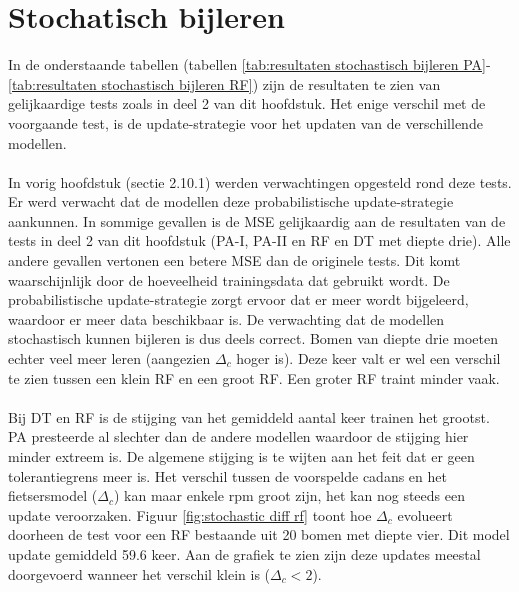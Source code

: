 \section{Stochatisch bijleren}
In de onderstaande tabellen (tabellen \ref{tab:resultaten stochastisch bijleren PA}-\ref{tab:resultaten stochastisch bijleren RF}) zijn de resultaten te zien van gelijkaardige tests zoals in deel 2 van dit hoofdstuk. Het enige verschil met de voorgaande test, is de update-strategie voor het updaten van de verschillende modellen.
\\\\
In vorig hoofdstuk (sectie 2.10.1) werden verwachtingen opgesteld rond deze tests. Er werd verwacht dat de modellen deze probabilistische update-strategie aankunnen. In sommige gevallen is de MSE gelijkaardig aan de resultaten van de tests in deel 2 van dit hoofdstuk (PA-I, PA-II en RF en DT met diepte drie). Alle andere gevallen vertonen een betere MSE dan de originele tests. Dit komt waarschijnlijk door de hoeveelheid trainingsdata dat gebruikt wordt. De probabilistische update-strategie zorgt ervoor dat er meer wordt bijgeleerd, waardoor er meer data beschikbaar is. De verwachting dat de modellen stochastisch kunnen bijleren is dus deels correct. Bomen van diepte drie moeten echter veel meer leren (aangezien $\Delta_c$ hoger is). Deze keer valt er wel een verschil te zien tussen een klein RF en een groot RF. Een groter RF traint minder vaak.
\\\\
Bij DT en RF is de stijging van het gemiddeld aantal keer trainen het grootst. PA presteerde al slechter dan de andere modellen waardoor de stijging hier minder extreem is. De algemene stijging is te wijten aan het feit dat er geen tolerantiegrens meer is. Het verschil tussen de voorspelde cadans en het fietsersmodel ($\Delta_c$) kan maar enkele rpm groot zijn, het kan nog steeds een update veroorzaken. Figuur \ref{fig:stochastic diff rf} toont hoe $\Delta_c$ evolueert doorheen de test voor een RF bestaande uit 20 bomen met diepte vier. Dit model update gemiddeld 59.6 keer. Aan de grafiek te zien zijn deze updates meestal doorgevoerd wanneer het verschil klein is ($\Delta_c<2$).
 

